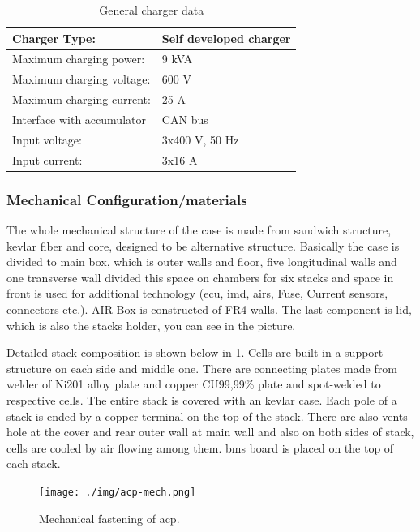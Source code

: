 \begin{table}[H]
	\centering
	\caption{General charger data}
	\begin{tabu}{|X|X|}
		\hline
		Charger Type: & Self developed charger \\
		\hline
		Maximum charging power: & 9 kVA  \\
		\hline
		Maximum charging voltage: & 600 V \\
		\hline
		Maximum charging current: & 25 A \\
		\hline
		Interface with accumulator & CAN bus \\
		\hline
		Input voltage: & 3x400 V, 50 Hz \\
		\hline
		Input current: & 3x16 A \\
		\hline
	\end{tabu}%
	\label{tab:acc-charger}%
\end{table}%

\subsubsection{Mechanical Configuration/materials}

The whole mechanical structure of the case is made from sandwich structure, kevlar fiber and core, designed to be alternative structure. Basically the case is divided to main box, which is outer walls and floor, five longitudinal walls and one transverse wall divided this space on chambers for six stacks and space in front is used for additional technology (\gls{ecu}, \gls{imd}, \glspl{air}, Fuse, Current sensors, connectors etc.). AIR-Box is constructed of FR4 walls. The last component is lid, which is also the stacks holder, you can see in the picture.

Detailed stack composition is shown below in \ref{fig:acp-mech}. Cells are built in a support structure on each side and middle one. There are connecting plates made from welder of Ni201 alloy plate and copper CU99,99\% plate and spot-welded to respective cells. The entire stack is covered with an kevlar case. Each pole of a stack is ended by a copper terminal on the top of the stack. There are also vents hole at the cover and rear outer wall at main wall and also on both sides of stack, cells are cooled by air flowing among them. \gls{bms} board is placed on the top of each stack.

\begin{figure}[H]
	\centering
	\texttt{[image: ./img/acp-mech.png]}
	\caption{Mechanical fastening of \gls{acp}.}
	\label{fig:acp-mech}
\end{figure}

